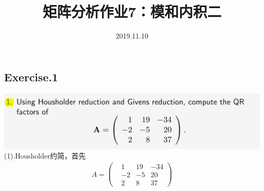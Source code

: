 \documentclass[UTF8,12pt, a4paper]{ctexart}
\title{矩阵分析作业7：模和内积二}
\author{2019.11.10}
\date{}
\begin{document}
  \maketitle
  \pagestyle{plain}
  \allowdisplaybreaks

  \subsection*{Exercise.1}

  \includegraphics[scale=0.8]{question1.png} \\
  (1).Housholder约简，首先
  \begin{align*}
    A = 
    \left(
      \begin{matrix}
        &1 & 19 & -34 \\
        &-2 & -5 & 20 \\
        &2 & 8 & 37 
      \end{matrix}
    \right)
  \end{align*}
\end{document}
